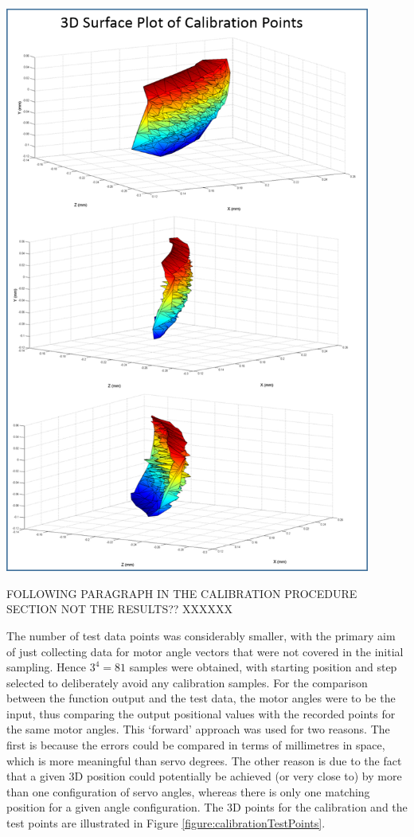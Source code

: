 \documentclass[11pt]{article}
\begin{document}
\begin{center}
\includegraphics[width=0.9\textwidth]{images/surfacePlotTogether.png}
\label{figure:surfacePlot}
\end{center}


FOLLOWING PARAGRAPH IN THE CALIBRATION PROCEDURE SECTION NOT THE RESULTS?? XXXXXX

The number of test data points was considerably smaller, with the primary aim of just collecting data for motor angle vectors that were not covered in the initial sampling. Hence $3^4 = 81$ samples were obtained, with starting position and step selected to deliberately avoid any calibration samples. For the comparison between the function output and the test data, the motor angles were to be the input, thus comparing the output positional values with the recorded points for the same motor angles. This `forward' approach was used for two reasons. The first is because the errors could be compared in terms of millimetres in space, which is more meaningful than servo degrees. The other reason is due to the fact that a given 3D position could potentially be achieved (or very close to) by more than one configuration of servo angles, whereas there is only one matching position for a given angle configuration. The 3D points for the calibration and the test points are illustrated in Figure \ref{figure:calibrationTestPoints}. 
\end{document}

